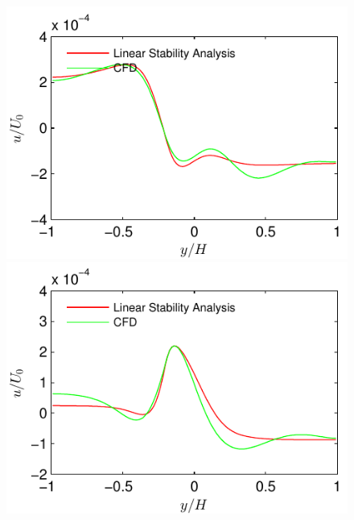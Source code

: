 \documentclass[12pt]{report}   %
\begin{document}
\begin{figure}
\centerline{\includegraphics{LinearStabilityVsCFD_Saturated_u_phase0} \includegraphics{LinearStabilityVsCFD_Saturated_u_phase90}}

\end{figure}
\end{document}
